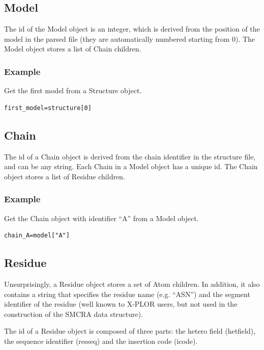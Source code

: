 \documentclass{report}
\begin{document}
\subsection{Model}

The id of the Model object is an integer, which is derived from the position
of the model in the parsed file (they are automatically numbered starting from
0). The Model object stores a list of Chain children.

\subsubsection{Example}

Get the first model from a Structure object.

\begin{verbatim}
first_model=structure[0]
\end{verbatim}

\subsection{Chain}

The id of a Chain object is derived from the chain identifier in the structure
file, and can be any string. Each Chain in a Model object has a unique id. The
Chain object stores a list of Residue children.

\subsubsection{Example}

Get the Chain object with identifier {}``A{}'' from a Model object.

\begin{verbatim}
chain_A=model["A"]
\end{verbatim}

\subsection{Residue}

Unsurprisingly, a Residue object stores a set of Atom children. In addition,
it also contains a string that specifies the residue name (e.g. {}``ASN{}'')
and the segment identifier of the residue (well known to X-PLOR users, but not
used in the construction of the SMCRA data structure).

The id of a Residue object is composed of three parts: the hetero field (hetfield),
the sequence identifier (resseq) and the insertion code (icode).
\end{document}
